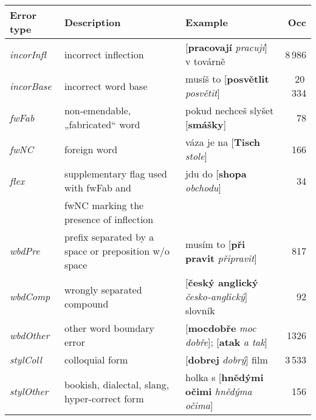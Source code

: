 \documentclass[11pt,a4paper]{article}
\begin{document}
\begin{table*}[ht!]
    \centering
    \small
    \setlength{\tabcolsep}{3.2pt}
    \begin{tabular}{l|l|l|r}
    Error type & Description & Example & Occ \\\hline
\emph{incorInfl} & incorrect inflection & [\textbf{pracovají}  \emph{pracují}] v továrně & 8\,986\\ \emph{incorBase} & incorrect word base & musíš to [\textbf{posvětlit}  \emph{posvětit}] & 20\,334 \\ \emph{fwFab} & non-emendable, „fabricated“ word & pokud nechceš slyšet [\textbf{smášky}] & 78 \\
\emph{fwNC} & foreign word & váza je na [\textbf{Tisch}  \emph{stole}] & 166 \\
\emph{flex} & supplementary flag used with fwFab and & jdu do [\textbf{shopa}  \emph{obchodu}] & 34 \\
      & fwNC marking the presence of inflection  & \\
\emph{wbdPre} & prefix separated by a space or preposition w/o space & musím to [\textbf{při pravit}  \emph{připravit}] & 817 \\
\emph{wbdComp} & wrongly separated compound & [\textbf{český anglický}  \emph{česko-anglický}] slovník & 92 \\
\emph{wbdOther} & other word boundary error  & [\textbf{mocdobře}  \emph{moc dobře}]; [\textbf{atak}  \emph{a tak}] & 1326 \\
\emph{stylColl} & colloquial form & [\textbf{dobrej}  \emph{dobrý}] film & 3\,533 \\
\emph{stylOther} & bookish, dialectal, slang, hyper-correct form & holka s [\textbf{hnědými očimi}  \emph{hnědýma očima}] & 156 \\
\hline


\end{tabular}
\end{table*}
\end{document}
